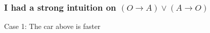 \documentclass[slidestop,compress,mathserif]{beamer}
\begin{document}
 \begin{frame}
  {
  \frametitle{I had a strong intuition on $(O\rightarrow
  A)\lor (A\rightarrow O)$}
  }

  { Case 1: The car above is faster }

\end{frame}
\end{document}
